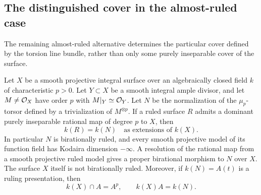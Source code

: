 \subsection{The distinguished cover in the almost-ruled case}

The remaining almost-ruled alternative determines the particular
cover defined by the torsion line bundle, rather than only some
purely inseparable cover of the surface.

\begin{proposition}\label{prop:distinguished-ruled-cover}
Let $X$ be a smooth projective integral surface over an
algebraically closed field $k$ of characteristic $p>0$.
Let $Y\subset X$ be a smooth integral ample divisor, and let
$M\ne\mathcal O_X$ have order $p$ with $M|_Y\simeq\mathcal O_Y$.
Let $N$ be the normalization of the $\mu_p$-torsor defined by
a trivialization of $M^{\otimes p}$.
If a ruled surface $R$ admits a dominant purely inseparable
rational map of degree $p$ to $X$, then
\[
 k(R)=k(N)\quad\text{as extensions of }k(X).
\]
In particular $N$ is birationally ruled, and every smooth
projective model of its function field has Kodaira dimension
$-\infty$. A resolution of the rational map from a smooth
projective ruled model gives a proper birational morphism
to $N$ over $X$. The surface $X$ itself is not birationally ruled.
Moreover, if $k(N)=A(t)$ is a ruling presentation, then
\[
 k(X)\cap A=A^p,\qquad k(X)A=k(N).
\]
\end{proposition}

